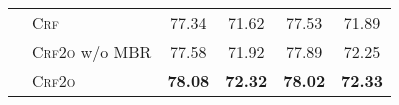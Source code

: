 \begin{table}[tb!]
\begin{tabular}{llcccc}
                             & \textsc{Crf}           & 77.34                   & 71.62                    & 77.53\rlap{$^\ddagger$}          & 71.89\rlap{$^\ddagger$}          \\
                             & \textsc{Crf2o} w/o MBR & 77.58                   & 71.92                    & 77.89                            & 72.25                            \\
                             & \textsc{Crf2o}         & \textbf{78.08}          & \textbf{72.32}           & \textbf{78.02}\rlap{$^\ddagger$} & \textbf{72.33}\rlap{$^\ddagger$} \\
    \bottomrule
  \end{tabular}
  \label{table:dev-test}
\end{table}


